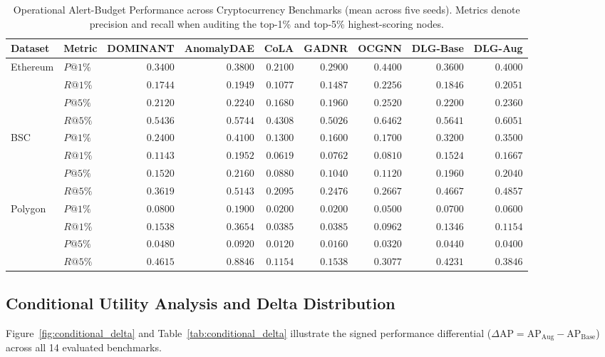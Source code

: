 \documentclass[11pt,a4paper]{article}
\begin{document}
\begin{table}[htbp]
\centering\small\setlength{\tabcolsep}{3.5pt}
\caption{Operational Alert-Budget Performance across Cryptocurrency Benchmarks (mean across five seeds). Metrics denote precision and recall when auditing the top-1\% and top-5\% highest-scoring nodes.}
\label{tab:alert_budget}
\begin{tabularx}{\textwidth}{llrrrrrrr}\toprule
\textbf{Dataset} & \textbf{Metric} & \textbf{DOMINANT} & \textbf{AnomalyDAE} & \textbf{CoLA} & \textbf{GADNR} & \textbf{OCGNN} & \textbf{DLG-Base} & \textbf{DLG-Aug} \\\midrule
\multirow{4}{*}{Ethereum} 
& $P@1\%$ & $0.3400$ & $0.3800$ & $0.2100$ & $0.2900$ & $\mathbf{0.4400}$ & $0.3600$ & $0.4000$ \\
& $R@1\%$ & $0.1744$ & $0.1949$ & $0.1077$ & $0.1487$ & $\mathbf{0.2256}$ & $0.1846$ & $0.2051$ \\
& $P@5\%$ & $0.2120$ & $0.2240$ & $0.1680$ & $0.1960$ & $\mathbf{0.2520}$ & $0.2200$ & $0.2360$ \\
& $R@5\%$ & $0.5436$ & $0.5744$ & $0.4308$ & $0.5026$ & $\mathbf{0.6462}$ & $0.5641$ & $0.6051$ \\\midrule
\multirow{4}{*}{BSC} 
& $P@1\%$ & $0.2400$ & $\mathbf{0.4100}$ & $0.1300$ & $0.1600$ & $0.1700$ & $0.3200$ & $0.3500$ \\
& $R@1\%$ & $0.1143$ & $\mathbf{0.1952}$ & $0.0619$ & $0.0762$ & $0.0810$ & $0.1524$ & $0.1667$ \\
& $P@5\%$ & $0.1520$ & $\mathbf{0.2160}$ & $0.0880$ & $0.1040$ & $0.1120$ & $0.1960$ & $0.2040$ \\
& $R@5\%$ & $0.3619$ & $\mathbf{0.5143}$ & $0.2095$ & $0.2476$ & $0.2667$ & $0.4667$ & $0.4857$ \\\midrule
\multirow{4}{*}{Polygon} 
& $P@1\%$ & $0.0800$ & $\mathbf{0.1900}$ & $0.0200$ & $0.0200$ & $0.0500$ & $0.0700$ & $0.0600$ \\
& $R@1\%$ & $0.1538$ & $\mathbf{0.3654}$ & $0.0385$ & $0.0385$ & $0.0962$ & $0.1346$ & $0.1154$ \\
& $P@5\%$ & $0.0480$ & $\mathbf{0.0920}$ & $0.0120$ & $0.0160$ & $0.0320$ & $0.0440$ & $0.0400$ \\
& $R@5\%$ & $0.4615$ & $\mathbf{0.8846}$ & $0.1154$ & $0.1538$ & $0.3077$ & $0.4231$ & $0.3846$ \\\bottomrule
\end{tabularx}
\end{table}

\subsection{Conditional Utility Analysis and Delta Distribution}
Figure~\ref{fig:conditional_delta} and Table~\ref{tab:conditional_delta} illustrate the signed performance differential ($\Delta\mathrm{AP} = \mathrm{AP}_{\mathrm{Aug}} - \mathrm{AP}_{\mathrm{Base}}$) across all 14 evaluated benchmarks.
\end{document}
